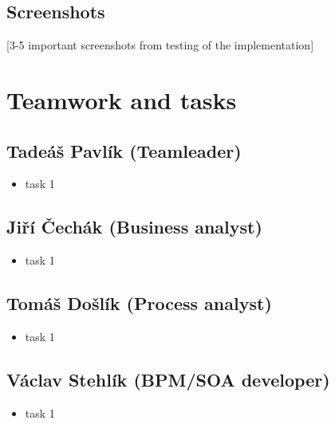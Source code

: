 \documentclass[11pt,a4paper]{article}
\begin{document}
\subsection{Screenshots}

[3-5 important screenshots from testing of the implementation]

\section{Teamwork and tasks}

\subsection{Tadeáš Pavlík (Teamleader)}

\begin{itemize}
    \item task 1
\end{itemize}

\subsection{Jiří Čechák (Business analyst)}

\begin{itemize}
    \item task 1
\end{itemize}

\subsection{Tomáš Došlík (Process analyst)}

\begin{itemize}
    \item task 1
\end{itemize}

\subsection{Václav Stehlík (BPM/SOA developer)}

\begin{itemize}
    \item task 1
\end{itemize}
\end{document}
